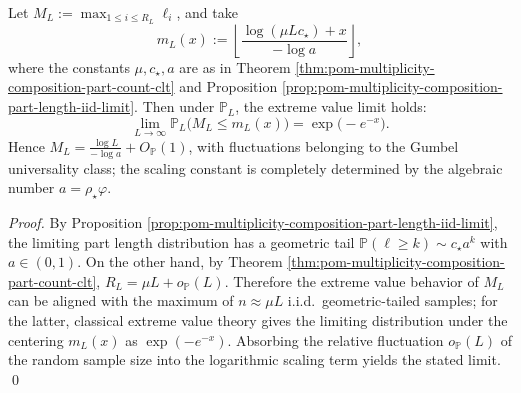\begin{theorem}\label{thm:pom-multiplicity-composition-max-part-gumbel}
Let \(M_L:=\max_{1\le i\le R_L}\ell_i\), and take
\[
m_L(x):=\left\lfloor \frac{\log(\mu L c_\star)+x}{-\log a}\right\rfloor ,
\]
where the constants \(\mu,c_\star,a\) are as in Theorem \ref{thm:pom-multiplicity-composition-part-count-clt} and Proposition \ref{prop:pom-multiplicity-composition-part-length-iid-limit}.
Then under \(\mathbb{P}_L\), the extreme value limit holds:
\[
\lim_{L\to\infty}\mathbb{P}_L\bigl(M_L\le m_L(x)\bigr)=\exp\bigl(-e^{-x}\bigr).
\]
Hence
\(
M_L=\frac{\log L}{-\log a}+O_{\mathbb{P}}(1)
\), with fluctuations belonging to the Gumbel universality class; the scaling constant is completely determined by the algebraic number \(a=\rho_\star\varphi\).
\end{theorem}
\begin{proof}
By Proposition \ref{prop:pom-multiplicity-composition-part-length-iid-limit}, the limiting part length distribution has a geometric tail
\(
\mathbb{P}(\ell\ge k)\sim c_\star a^k
\) with \(a\in(0,1)\).
On the other hand, by Theorem \ref{thm:pom-multiplicity-composition-part-count-clt}, \(R_L=\mu L+o_{\mathbb{P}}(L)\).
Therefore the extreme value behavior of \(M_L\) can be aligned with the maximum of \(n\approx \mu L\) i.i.d.\ geometric-tailed samples;
for the latter, classical extreme value theory gives the limiting distribution under the centering \(m_L(x)\) as \(\exp(-e^{-x})\).
Absorbing the relative fluctuation \(o_{\mathbb{P}}(L)\) of the random sample size into the logarithmic scaling term yields the stated limit. \qed
\end{proof}

